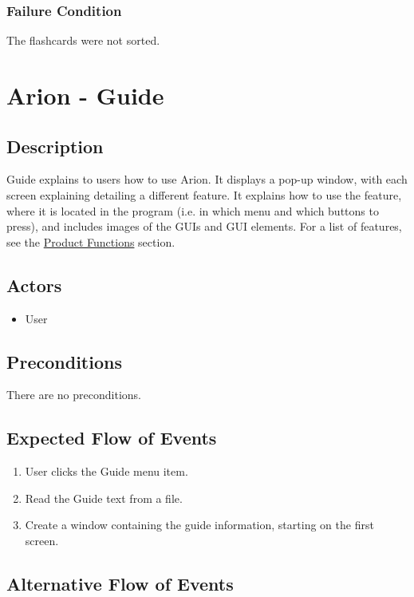 \documentclass{scrreprt}
\begin{document}
    \subsection{Failure Condition}
    The flashcards were not sorted.


\chapter{Arion - Guide}

\section{Description}
Guide explains to users how to use Arion.
It displays a pop-up window, with each screen explaining detailing a different feature.
It explains how to use the feature, where it is located in the program (i.e. in which menu and which buttons to press), and includes images of the GUIs and GUI elements.
For a list of features, see the \hyperref[sec:Product-Functions]{Product Functions} section.

\section{Actors}
\begin{itemize}
    \item User
\end{itemize}

\section{Preconditions}
There are no preconditions.

\section{Expected Flow of Events}
\begin{enumerate}[1.]
    \item User clicks the Guide menu item.
    \item Read the Guide text from a file.
    \item Create a window containing the guide information, starting on the first screen.
\end{enumerate}

\section{Alternative Flow of Events}
\end{document}
